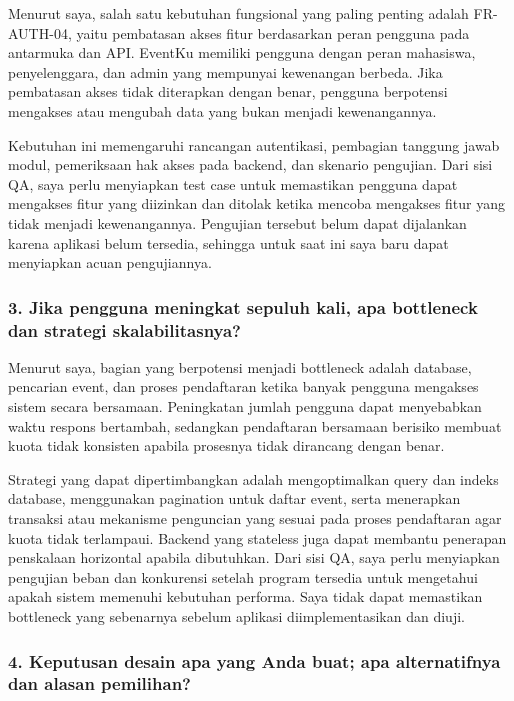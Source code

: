 \documentclass[11pt,a4paper]{article}
\begin{document}
Menurut saya, salah satu kebutuhan fungsional yang paling penting adalah FR-AUTH-04, yaitu pembatasan akses fitur berdasarkan peran pengguna pada antarmuka dan API. EventKu memiliki pengguna dengan peran mahasiswa, penyelenggara, dan admin yang mempunyai kewenangan berbeda. Jika pembatasan akses tidak diterapkan dengan benar, pengguna berpotensi mengakses atau mengubah data yang bukan menjadi kewenangannya.

Kebutuhan ini memengaruhi rancangan autentikasi, pembagian tanggung jawab modul, pemeriksaan hak akses pada backend, dan skenario pengujian. Dari sisi QA, saya perlu menyiapkan test case untuk memastikan pengguna dapat mengakses fitur yang diizinkan dan ditolak ketika mencoba mengakses fitur yang tidak menjadi kewenangannya. Pengujian tersebut belum dapat dijalankan karena aplikasi belum tersedia, sehingga untuk saat ini saya baru dapat menyiapkan acuan pengujiannya.



\subsubsection*{3. Jika pengguna meningkat sepuluh kali, apa bottleneck dan strategi skalabilitasnya?}

Menurut saya, bagian yang berpotensi menjadi bottleneck adalah database, pencarian event, dan proses pendaftaran ketika banyak pengguna mengakses sistem secara bersamaan. Peningkatan jumlah pengguna dapat menyebabkan waktu respons bertambah, sedangkan pendaftaran bersamaan berisiko membuat kuota tidak konsisten apabila prosesnya tidak dirancang dengan benar.

Strategi yang dapat dipertimbangkan adalah mengoptimalkan query dan indeks database, menggunakan pagination untuk daftar event, serta menerapkan transaksi atau mekanisme penguncian yang sesuai pada proses pendaftaran agar kuota tidak terlampaui. Backend yang stateless juga dapat membantu penerapan penskalaan horizontal apabila dibutuhkan. Dari sisi QA, saya perlu menyiapkan pengujian beban dan konkurensi setelah program tersedia untuk mengetahui apakah sistem memenuhi kebutuhan performa. Saya tidak dapat memastikan bottleneck yang sebenarnya sebelum aplikasi diimplementasikan dan diuji.



\subsubsection*{4. Keputusan desain apa yang Anda buat; apa alternatifnya dan alasan pemilihan?}
\end{document}
